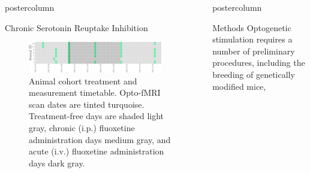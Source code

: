 \documentclass{beamer}
\newlength{\columnheight}
\begin{document}
\begin{frame}
\begin{columns}
\begin{column}{.43\textwidth}
\begin{beamercolorbox}[center]{postercolumn}
\begin{minipage}{.98\textwidth}
{\begin{myblock}{Chronic Serotonin Reuptake Inhibition}
						\vspace{0.5em}
						\begin{figure}
							\begin{minipage}{0.94\textwidth}
								\centering\includegraphics[width=0.9\textwidth]{img/tt.png}
								\caption{Animal cohort treatment and measurement timetable.
										Opto-fMRI scan dates are tinted turquoise.
										Treatment-free days are shaded light gray, chronic (i.p.)
										fluoxetine administration days medium gray, and acute
										(i.v.) fluoxetine administration days dark gray.}
								\label{fig:tt}
							\end{minipage}
						\end{figure}
					\end{myblock}\vfill
		}\end{minipage}\end{beamercolorbox}
	\end{column}
	\begin{column}{.57\textwidth}
		\begin{beamercolorbox}[center]{postercolumn}
			\begin{minipage}{.98\textwidth} %
				\parbox[t][\columnheight]{\textwidth}{ %
					\begin{myblock}{Methods}
						Optogenetic stimulation requires a number of preliminary 
						procedures, including the breeding of genetically modified mice,

\end{myblock}}
\end{minipage}
\end{beamercolorbox}
\end{column}
\end{columns}
\end{frame}
\end{document}
